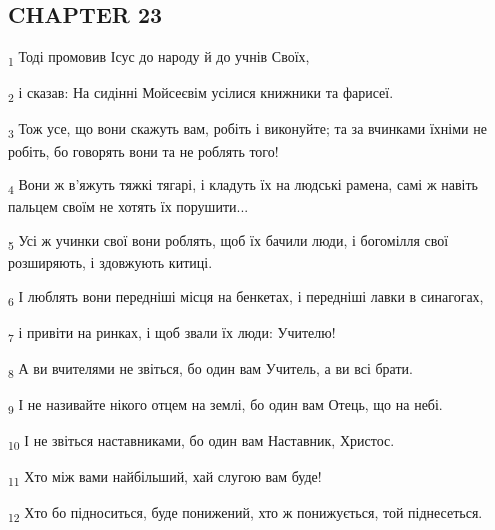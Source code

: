 \subsection{CHAPTER 23}
\begin{tcolorbox}
\textsubscript{1} Тоді промовив Ісус до народу й до учнів Своїх,
\end{tcolorbox}
\begin{tcolorbox}
\textsubscript{2} і сказав: На сидінні Мойсеєвім усілися книжники та фарисеї.
\end{tcolorbox}
\begin{tcolorbox}
\textsubscript{3} Тож усе, що вони скажуть вам, робіть і виконуйте; та за вчинками їхніми не робіть, бо говорять вони та не роблять того!
\end{tcolorbox}
\begin{tcolorbox}
\textsubscript{4} Вони ж в'яжуть тяжкі тягарі, і кладуть їх на людські рамена, самі ж навіть пальцем своїм не хотять їх порушити...
\end{tcolorbox}
\begin{tcolorbox}
\textsubscript{5} Усі ж учинки свої вони роблять, щоб їх бачили люди, і богомілля свої розширяють, і здовжують китиці.
\end{tcolorbox}
\begin{tcolorbox}
\textsubscript{6} І люблять вони передніші місця на бенкетах, і передніші лавки в синагогах,
\end{tcolorbox}
\begin{tcolorbox}
\textsubscript{7} і привіти на ринках, і щоб звали їх люди: Учителю!
\end{tcolorbox}
\begin{tcolorbox}
\textsubscript{8} А ви вчителями не звіться, бо один вам Учитель, а ви всі брати.
\end{tcolorbox}
\begin{tcolorbox}
\textsubscript{9} І не називайте нікого отцем на землі, бо один вам Отець, що на небі.
\end{tcolorbox}
\begin{tcolorbox}
\textsubscript{10} І не звіться наставниками, бо один вам Наставник, Христос.
\end{tcolorbox}
\begin{tcolorbox}
\textsubscript{11} Хто між вами найбільший, хай слугою вам буде!
\end{tcolorbox}
\begin{tcolorbox}
\textsubscript{12} Хто бо підноситься, буде понижений, хто ж понижується, той піднесеться.
\end{tcolorbox}
